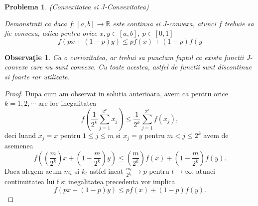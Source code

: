\documentclass[a4paper,12pt,oneside]{report}
\newtheorem{problem}{Problema}
\newtheorem{remark}{Observa\c{t}ie}
\begin{document}
\begin{problem}  (Convexitatea si J-Convexitatea)

Demonstrati ca daca \(f : \left [ a,b \right ]\rightarrow \mathbb{R} \) este continua si J-convexa, atunci \(f\) trebuie sa fie convexa, adica pentru orice $x, y\in [a,b],~ p\in [0,1]$
\begin{displaymath}
  f\left ( px + \left ( 1 - p \right )y \right )\leq pf\left ( x \right ) + \left ( 1-p \right )f\left ( y \right.
\end{displaymath}
\end{problem}
\begin{remark}
Ca o curiozitatea, ar trebui sa punctam faptul ca exista functii J-convexe care nu sunt convexe. Cu toate acestea, astfel de functii sunt discontinue si foarte rar utilizate.
\end{remark}
\begin{proof}
Dupa cum am observat in solutia anterioara, avem ca pentru orice \(k = 1,2,\cdots\) are loc inegalitatea
\begin{displaymath}
  f\left ( \frac{1}{2^{k}} \sum_{j = 1}^{2^{k}}x_{j}\right ) \leq  \frac{1}{2^{k}}\sum_{j = 1}^{2^{k}}f\left ( x_{j}\right ),
\end{displaymath}
deci luand \(x_{j} = x\) pentru \(1\leq j\leq m\) si \(x_{j} = y\) pentru \(m< j\leq 2^{k}\) avem de asemenea
\begin{displaymath}
  f\left ( \left ( \frac{m}{2^{k}} \right )x + \left ( 1 - \frac{m}{2^{k}} \right )y \right )\leq \left ( \frac{m}{2^{k}} \right )f\left ( x \right ) + \left ( 1 - \frac{m}{2^{k}} \right )f\left ( y \right ).
\end{displaymath}
Daca alegem acum \(m_{t}\) si \(k_{t}\) astfel incat \(\frac{m_{t}}{2^{k_{t}}} \rightarrow p\) pentru \(t \rightarrow \infty\), atunci continuitatea lui f si inegalitatea precedenta vor implica
\begin{displaymath}
  f\left ( px + \left ( 1 - p \right )y \right ) \leq  pf\left ( x \right ) + \left ( 1 - p \right )f\left ( y \right ).
\end{displaymath}
\end{proof}
\end{document}
